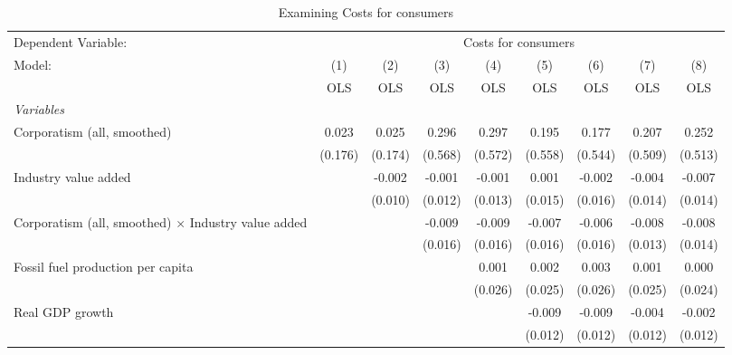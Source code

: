 
\begin{table}[htbp]
   \caption{Examining Costs for consumers}
   \centering
   \begin{tabular}{lcccccccc}
      \toprule
      Dependent Variable: & \multicolumn{8}{c}{Costs for consumers}\\
      Model:                                                     & (1)     & (2)     & (3)     & (4)     & (5)     & (6)     & (7)     & (8)\\  
                                                                 &  OLS    & OLS     & OLS     & OLS     & OLS     & OLS     & OLS     & OLS\\  
      \midrule
      \emph{Variables}\\
      Corporatism (all, smoothed)                                & 0.023   & 0.025   & 0.296   & 0.297   & 0.195   & 0.177   & 0.207   & 0.252\\   
                                                                 & (0.176) & (0.174) & (0.568) & (0.572) & (0.558) & (0.544) & (0.509) & (0.513)\\   
      Industry value added                                       &         & -0.002  & -0.001  & -0.001  & 0.001   & -0.002  & -0.004  & -0.007\\   
                                                                 &         & (0.010) & (0.012) & (0.013) & (0.015) & (0.016) & (0.014) & (0.014)\\   
      Corporatism (all, smoothed) $\times$ Industry value added  &         &         & -0.009  & -0.009  & -0.007  & -0.006  & -0.008  & -0.008\\   
                                                                 &         &         & (0.016) & (0.016) & (0.016) & (0.016) & (0.013) & (0.014)\\   
      Fossil fuel production per capita                          &         &         &         & 0.001   & 0.002   & 0.003   & 0.001   & 0.000\\   
                                                                 &         &         &         & (0.026) & (0.025) & (0.026) & (0.025) & (0.024)\\   
      Real GDP growth                                            &         &         &         &         & -0.009  & -0.009  & -0.004  & -0.002\\   
                                                                 &         &         &         &         & (0.012) & (0.012) & (0.012) & (0.012)\\   

\end{tabular}
\end{table}
